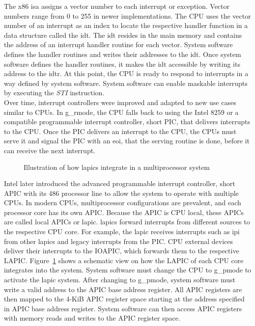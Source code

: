 The x86 \gls{isa} assigns a vector number to each interrupt or exception. Vector
numbers range from 0 to 255 in newer implementations. The CPU uses the vector
number of an interrupt as an index to locate the respective handler function in
a data structure called the \gls{idt}. The \gls{idt} resides in the main memory
and contains the address of an interrupt handler routine for each vector. System
software defines the handler routines and writes their addresses to the
\gls{idt}. Once system software defines the handler routines, it makes the
\gls{idt} accessible by writing its address to the \gls{idtr}. At this point,
the CPU is ready to respond to interrupts in a way defined by system software.
System software can enable maskable interrupts by executing the \textit{STI}
instruction.\\

Over time, interrupt controllers were improved and adapted to new use cases
similar to CPUs. In \gls{g_rmode}, the CPU falls back to using the Intel 8259 or a
compatible programmable interrupt controller, short PIC, that delivers
interrupts to the CPU. Once the PIC delivers an interrupt to the CPU, the CPUs
must serve it and signal the PIC with an \gls{eoi}, that
the serving routine is done, before it can receive the next interrupt. \\

\begin{figure}
    \begin{center}
        
        \caption{Illustration of how \glspl{lapic} integrate in a
            multiprocessor system}
        \label{fig:state:technical:lapic}
    \end{center}
\end{figure}

Intel later introduced the advanced programmable interrupt controller, short
APIC with its 486 processor line to allow the system to operate with multiple
CPUs. In modern CPUs, multiprocessor configurations are prevalent, and each
processor core has its own APIC. Because the APIC is CPU local, these APICs are
called local APICs or \gls{lapic}. \glspl{lapic} forward interrupts from
different sources to the respective CPU core. For example, the \gls{lapic}
receives interrupts such as \gls{ipi} from other \glspl{lapic} and legacy
interrupts from the PIC. CPU external devices deliver their interrupts to the
IOAPIC, which forwards them to the respective LAPIC.
Figure~\ref{fig:state:technical:lapic} shows a schematic view on how the LAPIC
of each CPU core integrates into the system. System software must change the CPU
to \gls{g_pmode} to activate the \gls{lapic} system. After changing to
\gls{g_pmode}, system software must write a valid address to the APIC base
address register. All APIC registers are then mapped to the 4-KiB APIC register
space starting at the address specified in APIC base address register. System
software can then access APIC registers with memory reads and writes to the APIC
register space.

